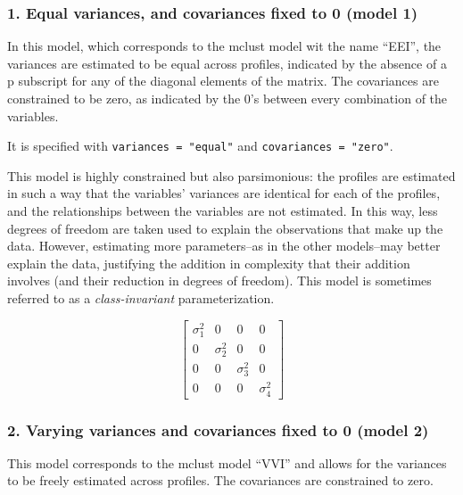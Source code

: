 \documentclass[man]{apa6}
\begin{document}
\hypertarget{equal-variances-and-covariances-fixed-to-0-model-1}{%
\subsubsection{1. Equal variances, and covariances fixed to 0 (model 1)}\label{equal-variances-and-covariances-fixed-to-0-model-1}}

In this model, which corresponds to the mclust model wit the name \enquote{EEI}, the variances are estimated to be equal across profiles, indicated by the absence of a p subscript for any of the diagonal elements of the matrix. The covariances are constrained to be zero, as indicated by the 0's between every combination of the variables.

It is specified with \texttt{variances\ =\ "equal"} and \texttt{covariances\ =\ "zero"}.

This model is highly constrained but also parsimonious: the profiles are estimated in such a way that the variables' variances are identical for each of the profiles, and the relationships between the variables are not estimated. In this way, less degrees of freedom are taken used to explain the observations that make up the data. However, estimating more parameters--as in the other models--may better explain the data, justifying the addition in complexity that their addition involves (and their reduction in degrees of freedom). This model is sometimes referred to as a \emph{class-invariant} parameterization.

\[
\left[ \begin{matrix} { \sigma  }_{ 1 }^{ 2 } & 0 & 0 & 0 \\ 0 & { \sigma  }_{ 2 }^{ 2 } & 0 & 0 \\ 0 & 0 & { \sigma  }_{ 3 }^{ 2 } & 0 \\ 0 & 0 & 0 & { \sigma  }_{ 4 }^{ 2 } \end{matrix} \right] 
\]

\hypertarget{varying-variances-and-covariances-fixed-to-0-model-2}{%
\subsubsection{2. Varying variances and covariances fixed to 0 (model 2)}\label{varying-variances-and-covariances-fixed-to-0-model-2}}

This model corresponds to the mclust model \enquote{VVI} and allows for the variances to be freely estimated across profiles. The covariances are constrained to zero.
\end{document}
